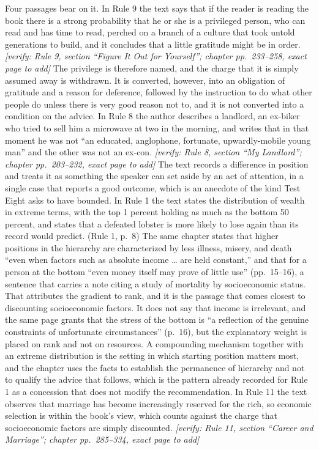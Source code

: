\documentclass[12pt]{article}
\newif\ifverify\verifytrue
\newcommand{\passage}[1]{\ifverify{\footnotesize\color{gray}\textit{[verify: #1]}}\fi}
\begin{document}
Four passages bear on it. In Rule 9 the text says that if the reader is reading the book there is a strong probability that he or she is a privileged person, who can read and has time to read, perched on a branch of a culture that took untold generations to build, and it concludes that a little gratitude might be in order. \passage{Rule 9, section ``Figure It Out for Yourself''; chapter pp.~233--258, exact page to add} The privilege is therefore named, and the charge that it is simply assumed away is withdrawn. It is converted, however, into an obligation of gratitude and a reason for deference, followed by the instruction to do what other people do unless there is very good reason not to, and it is not converted into a condition on the advice. In Rule 8 the author describes a landlord, an ex-biker who tried to sell him a microwave at two in the morning, and writes that in that moment he was not ``an educated, anglophone, fortunate, upwardly-mobile young man'' and the other was not an ex-con. \passage{Rule 8, section ``My Landlord''; chapter pp.~203--232, exact page to add} The text records a difference in position and treats it as something the speaker can set aside by an act of attention, in a single case that reports a good outcome, which is an anecdote of the kind Test Eight asks to have bounded. In Rule 1 the text states the distribution of wealth in extreme terms, with the top 1 percent holding as much as the bottom 50 percent, and states that a defeated lobster is more likely to lose again than its record would predict. (Rule 1, p.~8) The same chapter states that higher positions in the hierarchy are characterized by less illness, misery, and death ``even when factors such as absolute income \ldots{} are held constant,'' and that for a person at the bottom ``even money itself may prove of little use'' (pp.~15--16), a sentence that carries a note citing a study of mortality by socioeconomic status. That attributes the gradient to rank, and it is the passage that comes closest to discounting socioeconomic factors. It does not say that income is irrelevant, and the same page grants that the stress of the bottom is ``a reflection of the genuine constraints of unfortunate circumstances'' (p.~16), but the explanatory weight is placed on rank and not on resources. A compounding mechanism together with an extreme distribution is the setting in which starting position matters most, and the chapter uses the facts to establish the permanence of hierarchy and not to qualify the advice that follows, which is the pattern already recorded for Rule 1 as a concession that does not modify the recommendation. In Rule 11 the text observes that marriage has become increasingly reserved for the rich, so economic selection is within the book's view, which counts against the charge that socioeconomic factors are simply discounted. \passage{Rule 11, section ``Career and Marriage''; chapter pp.~285--334, exact page to add}
\end{document}
